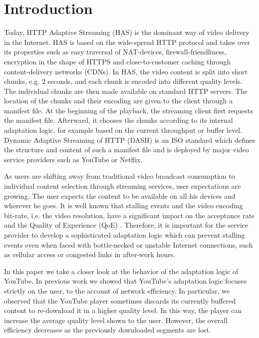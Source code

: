 
\section{Introduction}
\label{sec:introduction}

Today, HTTP Adaptive Streaming (HAS) is the dominant way of video delivery in the Internet. 
HAS is based on the wide-spread HTTP protocol and takes over its properties such as easy traversal of NAT-devices, firewall-friendliness, encryption in the shape of HTTPS and close-to-customer caching through content-delivery networks (CDNs).
In HAS, the video content is split into short chunks, e.g. $2$ seconds, and each chunk is encoded into different quality levels.
The individual chunks are then made available on standard HTTP servers.
The location of the chunks and their encoding are given to the client through a manifest file.
At the beginning of the playback, the streaming client first requests the manifest file. 
Afterward, it chooses the chunks according to its internal adaptation logic, for example based on the current throughput or buffer level.
Dynamic Adaptive Streaming of HTTP (DASH) is an ISO standard which defines the structure and content of such a manifest file and is deployed by major video service providers such as YouTube or Netflix.

As users are shifting away from traditional video broadcast consumption to individual content selection through streaming services, user expectations are growing. 
The user expects the content to be available on all his devices and wherever he goes. 
It is well known that stalling events and the video encoding bit-rate, i.e. the video resolution, have a significant impact on the acceptance rate and the Quality of Experience (QoE) \cite{casas2012youtube}.
Therefore, it is important for the service provider to develop a sophisticated adaptation logic which can prevent stalling events even when faced with bottle-necked or unstable Internet connections, such as cellular access or congested links in after-work hours.

In this paper we take a closer look at the behavior of the adaptation logic of YouTube.
In previous work we showed that YouTube's adaptation logic focuses strictly on the user, to the account of network efficiency.
In particular, we observed that the YouTube player sometimes discards its currently buffered content to re-download it in a higher quality level.
In this way, the player can increase the average quality level shown to the user.
However, the overall efficiency decreases as the previously downloaded segments are lost.

